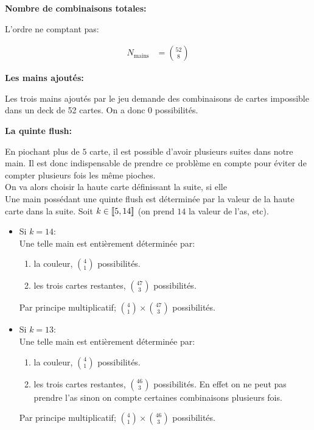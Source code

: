 \documentclass[10pt]{report}
\begin{document}
    \begin{description}
        \item \textbf{Nombre de combinaisons totales:}
        
        L'ordre ne comptant pas:

        \begin{align*}
            N_{\text{mains}} &= \binom{52}{8}
        \end{align*}

        \item \textbf{Les mains ajoutés:}
    
        Les trois mains ajoutés par le jeu demande des combinaisons de cartes 
        impossible dans un deck de 52 cartes.
        On a donc $0$ possibilités.

        \item \textbf{La quinte flush:}

        En piochant plus de $5$ carte, il est possible d'avoir plusieurs 
        suites dans notre main.
        Il est donc indispensable de prendre ce problème en compte pour 
        éviter de compter plusieurs fois les même pioches. \\ 
        On va alors choisir la haute carte définissant la suite, si elle \\
        Une main possédant une quinte flush est déterminée par la valeur de 
        la haute carte dans la suite.
        Soit $k \in [\![5, \space 14]\!]$ (on prend $14$ la 
        valeur de l'as, etc).

        \begin{itemize}
            \item Si $k = 14$: \\
            Une telle main est entièrement déterminée par: 
            \begin{enumerate}
                \item la couleur, \(\binom{4}{1}\) possibilités. 
                \item les trois cartes restantes, \(\binom{47}{3}\) 
                possibilités.
            \end{enumerate}
            Par principe multiplicatif; $\binom{4}{1} \times \binom{47}{3}$ 
            possibilités.

            \item Si $k = 13$: \\
            Une telle main est entièrement déterminée par:
            \begin{enumerate}
                \item la couleur, \(\binom{4}{1}\) possibilités.
                \item les trois cartes restantes, \(\binom{46}{3}\) 
                possibilités. En effet on ne peut pas prendre l'as 
                sinon on compte certaines combinaisons plusieurs fois.
            \end{enumerate}
            Par principe multiplicatif; $\binom{4}{1} \times \binom{46}{3}$ 
            possibilités.


\end{itemize}
\end{description}
\end{document}

